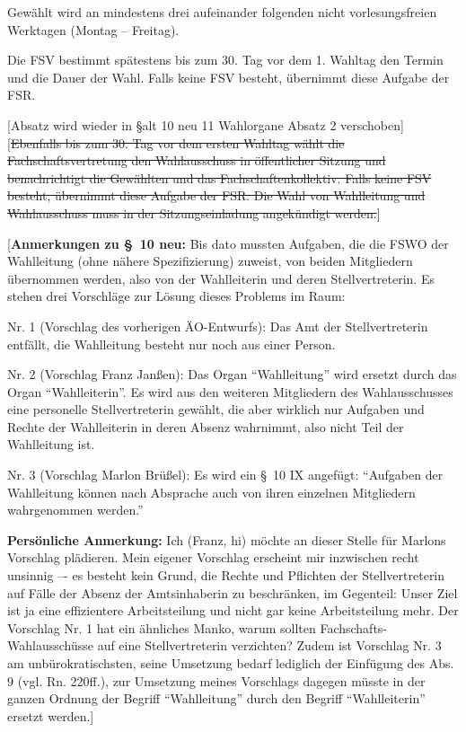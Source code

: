 \documentclass[%
draft,%
multilinesections%
]{fswo}
\newcommand\oldT[1]  {{\color{Gray}[\st{#1}]}}
\newcommand\bemFr[1] {{\color{Red}[#1]}}
\newcommand\bemTi[1] {{\color{Cyan}[#1]}} %
\newcommand\oldT[1]{}%
\newcommand\bemFr[1]{}%
\newcommand\bemTi[1]{}%
\begin{document}
\begin{contract}
Gewählt wird an mindestens drei aufeinander folgenden nicht vorlesungsfreien Werktagen (Montag -- Freitag).

Die FSV bestimmt spätestens bis zum 30. Tag vor dem 1. Wahltag den Termin und die Dauer der Wahl.
Falls keine FSV besteht, übernimmt diese Aufgabe der FSR.


\bemTi{Absatz wird wieder in \S alt 10 neu 11 Wahlorgane Absatz 2 verschoben}
\oldT{Ebenfalls bis zum 30. Tag vor dem ersten Wahltag wählt die Fachschaftsvertretung den Wahlausschuss in öffentlicher Sitzung und benachrichtigt die Gewählten und das Fachschaftenkollektiv.
Falls keine FSV besteht, übernimmt diese Aufgabe der FSR.
Die Wahl von Wahlleitung und Wahlausschuss muss in der Sitzungseinladung angekündigt werden.}
\end{contract}

\bemFr{\textbf{Anmerkungen zu \S~10 neu:}
Bis dato mussten Aufgaben, die die FSWO der Wahlleitung (ohne nähere Spezifizierung) zuweist, von beiden Mitgliedern übernommen werden, also von der Wahlleiterin und deren Stellvertreterin.
Es stehen drei Vorschläge zur Lösung dieses Problems im Raum:

Nr. 1 (Vorschlag des vorherigen ÄO-Entwurfs):
Das Amt der Stellvertreterin entfällt, die Wahlleitung besteht nur noch aus einer Person.

Nr. 2 (Vorschlag Franz Janßen):
Das Organ \enquote{Wahlleitung} wird ersetzt durch das Organ \enquote{Wahlleiterin}.
Es wird aus den weiteren Mitgliedern des Wahlausschusses eine personelle Stellvertreterin gewählt,
die aber wirklich nur Aufgaben und Rechte der Wahlleiterin in deren Absenz wahrnimmt, also nicht Teil der Wahlleitung ist.

Nr. 3 (Vorschlag Marlon Brüßel):
Es wird ein \S~10 IX angefügt: \enquote{Aufgaben der Wahlleitung können nach Absprache auch von ihren einzelnen Mitgliedern wahrgenommen werden.}

\textbf{Persönliche Anmerkung:} Ich (Franz, hi) möchte an dieser Stelle für Marlons Vorschlag plädieren.
Mein eigener Vorschlag erscheint mir inzwischen recht unsinnig –- es besteht kein Grund,
die Rechte und Pflichten der Stellvertreterin auf Fälle der Absenz der Amtsinhaberin zu beschränken, im Gegenteil:
Unser Ziel ist ja eine effizientere Arbeitsteilung und nicht gar keine Arbeitsteilung mehr.
Der Vorschlag Nr. 1 hat ein ähnliches Manko, warum sollten Fachschafts-Wahlausschüsse auf eine Stellvertreterin verzichten?
Zudem ist Vorschlag Nr. 3 am unbürokratischsten, seine Umsetzung bedarf lediglich der Einfügung des Abs. 9 (vgl. Rn. 220ff.),
zur Umsetzung meines Vorschlags dagegen müsste in der ganzen Ordnung der Begriff \enquote{Wahlleitung} durch den Begriff \enquote{Wahlleiterin} ersetzt werden.}
\end{document}
